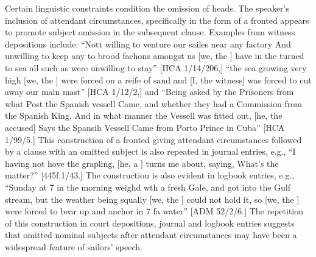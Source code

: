 Certain linguistic constraints condition the omission of  heads. The speaker’s inclusion of attendant circumstances, specifically in the form of a fronted  appears to promote  subject omission in the subsequent clause. Examples from witness depositions include: “Nott willing to venture our sailes near any factory And unwilling to keep any to brood fachons amongst us [we, the ] have in the  turned to sea all such as were unwilling to stay” [HCA 1/14/206,] “the sea growing very high [we, the ] were forced on a reife of sand and [I, the witness] was forced to cut away our main mast” [HCA 1/12/2,] and “Being asked by the Prisoners from what Post the Spanish vessell Came, and whether they had a Commission from the Spanish King, And in what manner the Vessell was fitted out, [he, the accused] Says the Spansih Vessell Came from Porto Prince in Cuba” [HCA 1/99/5.] This construction of a fronted  giving attendant circumstances followed by a clause with an omitted  subject is also repeated in journal entries, e.g., “I having not hove the grapling, [he, a ] turns me about, saying, What’s the matter?” [445f.1/43.] The construction is also evident in logbook entries, e.g., “Sunday at 7 in the morning weighd wth a fresh Gale, and got into the Gulf stream, but the weather being squally [we, the ] could not hold it, so [we, the ] were forced to bear up and anchor in 7 fa water” [ADM 52/2/6.] The repetition of this construction in court depositions, journal and logbook entries suggests that omitted nominal subjects after attendant circumstances may have been a widespread feature of sailors’ speech. 

